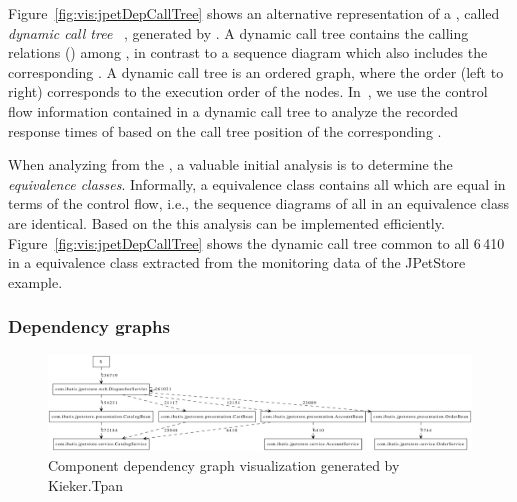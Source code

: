 Figure~\ref{fig:vis:jpetDepCallTree} shows an alternative representation of %
a \trace{}, called \textit{dynamic call tree}%
~\citep{AmmonsBallLarus97ExploitingHardwarePerformanceCountersWithFlowAndContextSensitiveProfiling}, generated by \KiekerTpan{}. A dynamic call tree %
contains the calling relations (\callMessages{}) among \operations{}, in contrast %
to a sequence diagram which also includes the corresponding \returnMessages{}. A dynamic call tree is an ordered graph, where the order (left to right) corresponds to the execution order of the nodes.
In~\citep{RohrvanHoornGieseckeMatevskaHasselbringAlekseev2008TraceContextSensitivePerformanceProfilingForEnterpriseSoftwareApplications}, %
we use the control flow information contained in a dynamic call tree to %
analyze the recorded response times of \operations{} based on the call tree position of the %
corresponding \executions{}.

When analyzing \traces{} from the \MonitoringLog{}, a valuable initial analysis %
is to determine the \trace{} \textit{equivalence classes}. %
Informally, a \trace{} equivalence class contains all \traces{} which are equal %
in terms of the control flow, i.e., the sequence diagrams of all \traces{} in an 
equivalence class are identical. %
Based on the \messageTraces{} this analysis can be implemented efficiently. %
Figure~\ref{fig:vis:jpetDepCallTree} shows the dynamic call tree common to all 6\,410~\traces{} %
in a \trace{} equivalence class extracted from the monitoring data of the JPetStore example. %

\subsubsection{Dependency graphs}

\begin{figure}\centering
\includegraphics[width=\textwidth]{figures/20090710-163529-jpetstore-250Threads-400sDuration-200sRampup-dependencyGraph}%
\caption{Component dependency graph visualization generated by Kieker.Tpan}
\label{fig:vis:jpetDepDiagr}
\end{figure}


